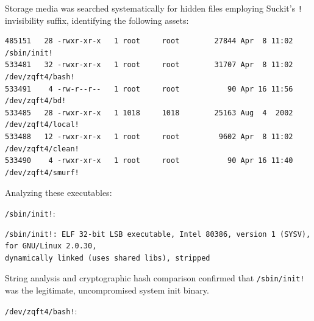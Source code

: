 Storage media was searched systematically for hidden files employing Suckit's \texttt{!} invisibility suffix, identifying the following assets:

\vspace{1em}

\begin{lstlisting}[style=terminal]
485151   28 -rwxr-xr-x   1 root     root        27844 Apr  8 11:02 /sbin/init!
533481   32 -rwxr-xr-x   1 root     root        31707 Apr  8 11:02 /dev/zqft4/bash!
533491    4 -rw-r--r--   1 root     root           90 Apr 16 11:56 /dev/zqft4/bd!
533485   28 -rwxr-xr-x   1 1018     1018        25163 Aug  4  2002 /dev/zqft4/local!
533488   12 -rwxr-xr-x   1 root     root         9602 Apr  8 11:02 /dev/zqft4/clean!
533490    4 -rwxr-xr-x   1 root     root           90 Apr 16 11:40 /dev/zqft4/smurf!
\end{lstlisting}

\vspace{1em}

Analyzing these executables:

\texttt{/sbin/init!}:

\vspace{1em}

\begin{lstlisting}[style=terminal]
/sbin/init!: ELF 32-bit LSB executable, Intel 80386, version 1 (SYSV), for GNU/Linux 2.0.30, 
dynamically linked (uses shared libs), stripped
\end{lstlisting}

\vspace{1em}

String analysis and cryptographic hash comparison confirmed that \texttt{/sbin/init!} was the legitimate, uncompromised system init binary.

\texttt{/dev/zqft4/bash!}:

\vspace{1em}

